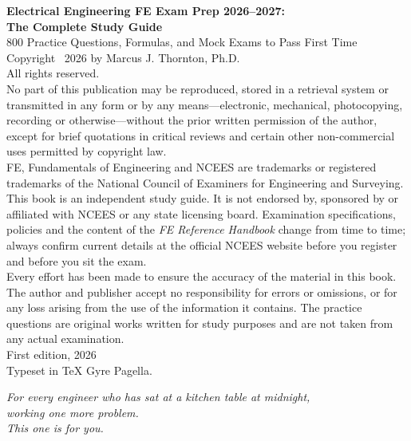 {\small\raggedright
\textbf{Electrical Engineering FE Exam Prep 2026--2027:\\ The Complete Study Guide}\\
800 Practice Questions, Formulas, and Mock Exams to Pass First Time\\[10pt]
Copyright \textcopyright\ 2026 by Marcus J. Thornton, Ph.D.\\
All rights reserved.\\[10pt]
No part of this publication may be reproduced, stored in a retrieval system or transmitted in any form or by any means---electronic, mechanical, photocopying, recording or otherwise---without the prior written permission of the author, except for brief quotations in critical reviews and certain other non-commercial uses permitted by copyright law.\\[10pt]
FE, Fundamentals of Engineering and NCEES are trademarks or registered trademarks of the National Council of Examiners for Engineering and Surveying. This book is an independent study guide. It is not endorsed by, sponsored by or affiliated with NCEES or any state licensing board. Examination specifications, policies and the content of the \emph{FE Reference Handbook} change from time to time; always confirm current details at the official NCEES website before you register and before you sit the exam.\\[10pt]
Every effort has been made to ensure the accuracy of the material in this book. The author and publisher accept no responsibility for errors or omissions, or for any loss arising from the use of the information it contains. The practice questions are original works written for study purposes and are not taken from any actual examination.\\[10pt]
First edition, 2026\\[10pt]
Typeset in TeX Gyre Pagella.\\
}
\clearpage
\thispagestyle{empty}
\vspace*{0.3\textheight}
\begin{center}
{\itshape\large\color{inkblue}For every engineer who has sat at a kitchen table at midnight,\\ working one more problem.\\[8pt] This one is for you.\par}
\end{center}
\clearpage
\thispagestyle{empty}\mbox{}\clearpage
